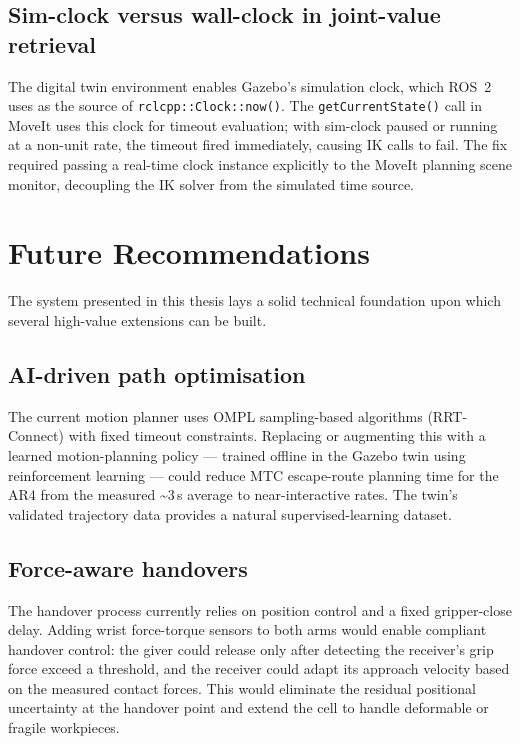 \subsection{Sim-clock versus wall-clock in joint-value retrieval}
The digital twin environment enables Gazebo's simulation clock, which ROS~2 uses as the
source of \texttt{rclcpp::Clock::now()}.  The \texttt{getCurrentState()} call in MoveIt
uses this clock for timeout evaluation; with sim-clock paused or running at a non-unit rate,
the timeout fired immediately, causing IK calls to fail.  The fix required passing a
real-time clock instance explicitly to the MoveIt planning scene monitor, decoupling the
IK solver from the simulated time source.

\section{Future Recommendations}
\label{sec:future}

The system presented in this thesis lays a solid technical foundation upon which several
high-value extensions can be built.

\subsection{AI-driven path optimisation}
The current motion planner uses OMPL sampling-based algorithms (RRT-Connect) with fixed
timeout constraints.  Replacing or augmenting this with a learned motion-planning policy —
trained offline in the Gazebo twin using reinforcement learning — could reduce MTC escape-route
planning time for the AR4 from the measured \textasciitilde{}3\,s average to near-interactive
rates.  The twin's validated trajectory data provides a natural supervised-learning dataset.

\subsection{Force-aware handovers}
The handover process currently relies on position control and a fixed gripper-close delay.
Adding wrist force-torque sensors to both arms would enable compliant handover control: the
giver could release only after detecting the receiver's grip force exceed a threshold, and the
receiver could adapt its approach velocity based on the measured contact forces.  This would
eliminate the residual positional uncertainty at the handover point and extend the cell to
handle deformable or fragile workpieces.

